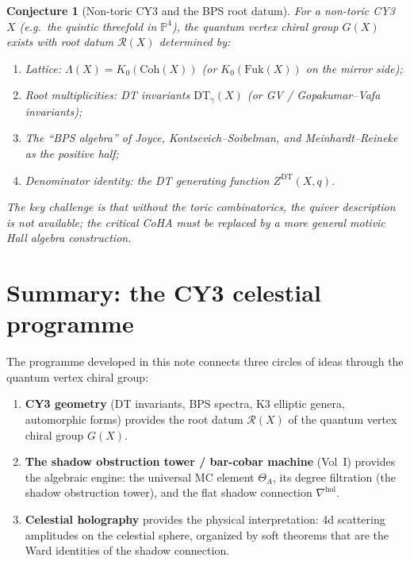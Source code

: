 \documentclass[11pt]{article}
\newtheorem{conjecture}[theorem]{Conjecture}
\theoremstyle{definition}
\theoremstyle{remark}
\newcommand{\Fuk}{\mathrm{Fuk}}
\newcommand{\Coh}{\mathrm{Coh}}
\newcommand{\DT}{\mathrm{DT}}
\begin{document}
\begin{conjecture}[Non-toric CY3 and the BPS root datum]
\label{conj:non-toric}
For a non-toric CY3 $X$ (e.g.\ the quintic threefold in
$\mathbb{P}^4$), the quantum vertex chiral group $G(X)$ exists
with root datum $\mathcal{R}(X)$ determined by:
\begin{enumerate}[label=(\roman*)]
\item Lattice: $\Lambda(X) = K_0(\Coh(X))$ (or
 $K_0(\Fuk(X))$ on the mirror side);
\item Root multiplicities: DT invariants $\DT_\gamma(X)$ (or
 GV / Gopakumar--Vafa invariants);
\item The ``BPS algebra'' of Joyce, Kontsevich--Soibelman, and
 Meinhardt--Reineke as the positive half;
\item Denominator identity: the DT generating function
 $Z^{\DT}(X, q)$.
\end{enumerate}
The key challenge is that without the toric combinatorics, the
quiver description is not available; the critical CoHA must be
replaced by a more general motivic Hall algebra construction.
\end{conjecture}

\section{Summary: the CY3 celestial programme}
\label{sec:summary}

The programme developed in this note connects three circles of
ideas through the quantum vertex chiral group:

\begin{enumerate}[label=(\arabic*)]
\item \textbf{CY3 geometry} (DT invariants, BPS spectra, K3
 elliptic genera, automorphic forms) provides the root datum
 $\mathcal{R}(X)$ of the quantum vertex chiral group $G(X)$.

\item \textbf{The shadow obstruction tower / bar-cobar machine} (Vol~I)
 provides the algebraic engine: the universal MC element
 $\Theta_A$, its degree filtration (the shadow obstruction tower),
 and the flat shadow connection $\nabla^{\mathrm{hol}}$.

\item \textbf{Celestial holography} provides the physical
 interpretation: 4d scattering amplitudes on the celestial
 sphere, organized by soft theorems that are the Ward identities
 of the shadow connection.
\end{enumerate}
\end{document}
